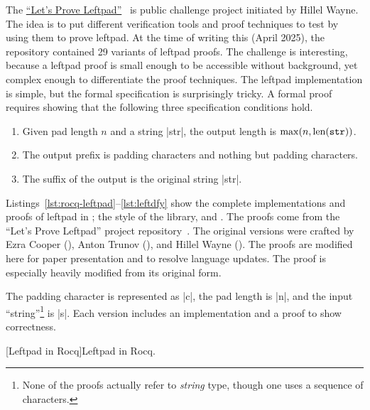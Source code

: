 The \href{https://github.com/hwayne/lets-prove-leftpad}{\enquote{Let's Prove
Leftpad}}~\cite{leftpad} is public challenge project initiated by Hillel Wayne.
The idea is to put different verification tools and proof techniques to test by
using them to prove leftpad. At the time of writing this (April 2025), the
repository contained 29 variants of leftpad proofs. The challenge is
interesting, because a leftpad proof is small enough to be accessible without
 background, yet complex enough to differentiate the proof
techniques. The leftpad implementation is simple, but the formal
specification is surprisingly tricky. A formal proof
requires showing that the following three specification conditions hold.

\begin{enumerate}
\item Given pad length \(n\) and a string \pr|str|, the output length is
\(\max(n, \text{len}(\prm{str}))\).
\item The output prefix is padding characters and nothing but padding
characters.
\item The suffix of the output is the original string \pr|str|.
\end{enumerate}

Listings~\autoref{lst:rocq-leftpad}--\ref{lst:leftdfy} show the complete
implementations and proofs of leftpad in ; the  style
of the  library, and . The proofs come
from the \enquote{Let's Prove Leftpad} project repository~\cite{leftpad}. The
original versions were crafted by Ezra Cooper (), Anton Trunov
(), and Hillel Wayne (). The proofs are modified here
for paper presentation and to resolve language updates. The  proof is
especially heavily modified from its original form.

The padding character is represented as \pr|c|, the pad length is \pr|n|, and
the input \enquote{string}\footnote{ None of the proofs actually refer to
\emph{string} type, though one uses a sequence of characters.} is \pr|s|. Each
version includes an implementation and a proof to show correctness.

\begin{center}
\captionsetup{type=lstlisting}
[Leftpad in Rocq]{Leftpad in Rocq.}
\label{lst:rocq-leftpad}
\end{center}

